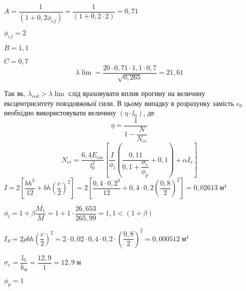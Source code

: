 \documentclass[a4paper,14pt]{article}
\begin{document}
\begin{enumerate}
            $A = \dfrac{1}{(1+0,2\phi_{ef})} = \dfrac{1}{(1+0,2 \cdot 2)} = 0,71$

            $\phi_{ef} = 2$

            $B = 1,1$

            $C = 0,7$
            $$\lambda\lim = \dfrac{20 \cdot 0,71 \cdot 1,1 \cdot 0,7}{\sqrt{0,265}} = 21,61$$

        Так як, $\lambda_{red} > \lambda\lim$ слід враховувати вплив прогину на величину ексцентриситету повздовжньої сили. В цьому випадку в розрахунку замість $e_0$ необхідно використовувати
        величину $(\eta \cdot l_0)$, де 
        \begin{equation}
            \eta = \dfrac{1}{1 - \dfrac{N}{N_{cr}}}
        \end{equation}
        \begin{equation}
            N_{cr} = \dfrac{6,4E_{cm}}{l_0^2}\left[\dfrac{I}{\phi_l}\left(\dfrac{0,11}{0,1 + \dfrac{\sigma_e}{\phi_p}} + 0,1\right) + \alpha I_s\right]
        \end{equation}
        $I = 2\left[\dfrac{bh^3}{12} + bh \left(\dfrac{c}{2}\right)^2\right] = 2\left[\dfrac{0,4 \cdot 0,2^3}{12} + 0,4 \cdot 0,2 \left(\dfrac{0,8}{2}\right)^2\right] = 0,02613\;\textit{м}^4$

        $\phi_l = 1 + \beta \dfrac{M_1}{M} = 1 + 1 \cdot \dfrac{26,653}{265,99} = 1,1 < (1 + \beta)$

        $I_S = 2 \rho bh \left(\dfrac{c}{2}\right)^2 = 2 \cdot 0,02 \cdot 0,4 \cdot 0,2 \cdot \left(\dfrac{0,8}{2}\right)^2 = 0,000512\;\textit{м}^4$

        $\sigma_e = \dfrac{l_0}{h_\textit{н}} = \dfrac{12,9}{1} = 12,9\;\textit{м}$

        $\phi_p = 1$


\end{enumerate}
\end{document}
